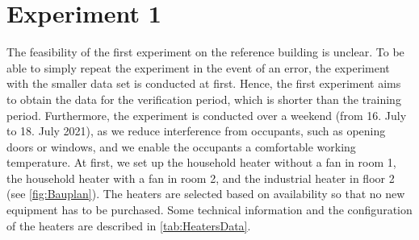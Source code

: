 \section{Experiment 1}
\label{sec:Experiment1}
The feasibility of the first experiment on the reference building is unclear. To be able to simply repeat the experiment in the event of an error, the experiment with the smaller data set is conducted at first. Hence, the first experiment aims to obtain the data for the verification period, which is shorter than the training period. Furthermore, the experiment is conducted over a weekend (from 16. July to 18. July 2021), as we reduce interference from occupants, such as opening doors or windows, and we enable the occupants a comfortable working temperature. \newline
At first, we set up the household heater without a fan in room 1, the household heater with a fan in room 2, and the industrial heater in floor 2 (see \autoref{fig:Bauplan}). The heaters are selected based on availability so that no new equipment has to be purchased. Some technical information and the configuration of the heaters are described in \autoref{tab:HeatersData}.
